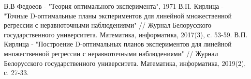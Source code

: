 \begin{thebibliography}{}
	 В.В Федоеов - "Теория оптимального эксперимента", 1971
	 В.П. Кирлица - "Точные  D-оптимальные планы экспериментов для линейной множественной регрессии с неравноточными наблюдениями" // Журнал Белорусского государственного университета. Математика, информатика, 2017(3), с. 53-59.
	 В.П. Кирлица - "Построение  D-оптимальных  планов экспериментов для линейной множественной регрессии с неравноточными наблюдениями" // Журнал Белорусского государственного университета. Математика, информатика, 2019(2), с. 27-33.
\end{thebibliography}